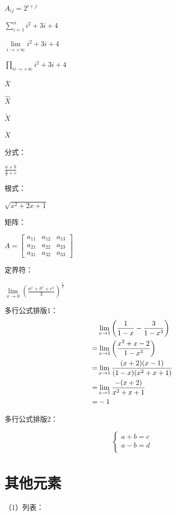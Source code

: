 \documentclass[a4paper]{article}
\begin{document}
$A_{ij}=2^{i+j}$ %

$\sum\limits_{i=1}^{n}{i^2+3i+4}$

$\lim\limits_{i\to +\infty}{i^2+3i+4}$

$\prod\limits_{ii\to +\infty}{i^2+3i+4}$

$\overline{X}$

$\hat{X}$

$\widetilde{X}$

$\dot{X}$

分式：

$\frac{a+b}{\frac{a}{b}+c}$

根式：

$\sqrt{x^2+2x+1}$

矩阵：

$A=\begin{bmatrix}
    a_{11} & a_{12} & a_{13}\\
    a_{21} & a_{22} & a_{23}\\
    a_{31} & a_{32} & a_{33}
\end{bmatrix}$

定界符：

$\lim\limits_{x \to 0}\left(\frac{a^x+b^x+c^x}{3}\right)^{\frac1x}$   %

多行公式排版1：
\begin{align}
&\lim\limits_{x\to 1}\left(\frac{1}{1-x}-\frac{3}{1-x^3}\right) \notag\\
= &\lim\limits_{x\to 1}\left(\frac{x^2+x-2}{1-x^3}\right) \notag\\
=&\lim\limits_{x\to 1}\frac{(x+2)(x-1)}{(1-x)(x^2+x+1)} \notag\\
=&\lim\limits_{x\to 1}\frac{-(x+2)}{x^2+x+1} \notag\\
=& -1
\end{align}

多行公式排版2：

\begin{equation}
 \begin{cases}
 a+b=c\\
 a-b=d\\
 \end{cases}
\end{equation}

\section{其他元素} %
（1）列表：
\end{document}
